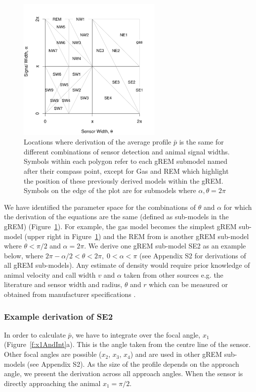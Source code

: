 \documentclass[a4paper,10pt,reqno,oneside]{amsart}
\begin{document}
\begin{figure}
\centering
\includegraphics[width=7cm]{imgs/equalRegions.pdf}
\caption{Locations where derivation of the average profile $\bar{p}$ is the same for different combinations of sensor detection and animal signal widths. Symbols within each polygon refer to each gREM submodel named after their compass point, except for Gas and REM which highlight the position of these previously derived models within the gREM. Symbols on the edge of the plot are for submodels where $\alpha, \theta = 2\pi$}
\label{f:equalRegions}
\end{figure}

We have identified the parameter space for the combinations of $\theta$ and $\alpha$ for which the derivation of the equations are the same (defined as sub-models in the gREM) (Figure~\ref{f:equalRegions}). For example, the gas model becomes the simplest gREM sub-model (upper right in Figure~\ref{f:equalRegions}) and the REM from \citet{rowcliffe2008estimating} is another gREM sub-model where $\theta<\pi/2$ and $\alpha = 2\pi$. We derive one gREM sub-model SE2 as an example below, where $2 \pi - \alpha/2 < \theta < 2\pi ,\; 0 < \alpha <\pi$ (see Appendix S2 for derivations of all gREM sub-models). Any estimate of density would require prior knowledge of animal velocity and call width $v$ and $\alpha$ taken from other sources e.g. the literature \citep{brinklov2011, carbone2005far} and sensor width and radius, $\theta$ and  $r$ which can be measured or obtained from manufacturer specifications \citep{holderied2003echolocation, adams2012you}.


\subsubsection*{Example derivation of SE2}

In order to calculate $\bar{p}$, we have to integrate over the focal angle, $x_1$ (Figure~\ref{f:x1AndInt}a). This is the angle taken from the centre line of the sensor. Other focal angles are possible ($x_2$, $x_3$, $x_4$) and are used in other gREM sub-models (see Appendix S2). As the size of the profile depends on the approach angle, we present the derivation across all approach angles. When the sensor is directly approaching the animal $x_1  = \pi/2$.
\end{document}
